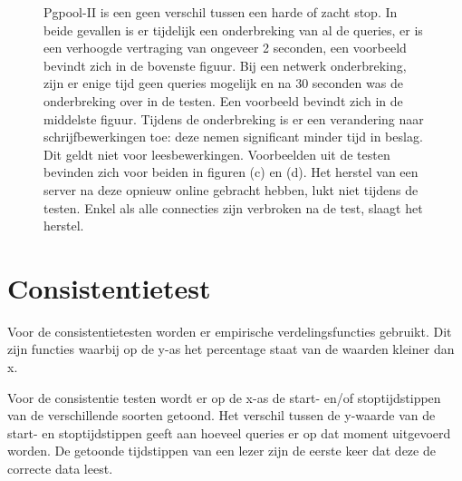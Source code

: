 \begin{figure}[ht!]
{	Pgpool-II is een geen verschil tussen een harde of zacht stop. In beide gevallen is er tijdelijk een onderbreking van al de queries, er is een verhoogde vertraging van ongeveer 2 seconden, een voorbeeld bevindt zich in de bovenste figuur. \newline
	Bij een netwerk onderbreking, zijn er enige tijd geen queries mogelijk en na 30 seconden was de onderbreking over in de testen. Een voorbeeld bevindt zich in de middelste figuur.  \newline
	Tijdens de onderbreking is er een verandering naar schrijfbewerkingen toe: deze nemen significant minder tijd in beslag. Dit geldt niet voor leesbewerkingen. Voorbeelden uit de testen bevinden zich voor beiden in figuren (c) en (d). \newline
	Het herstel van een server na deze opnieuw online gebracht hebben, lukt niet tijdens de testen. Enkel als alle connecties zijn verbroken na de test, slaagt het herstel.  }
	\label{fig:beschikbaar-pgpool}
\end{figure}

\FloatBarrier
\section{Consistentietest}
Voor de consistentietesten worden er empirische verdelingsfuncties gebruikt. Dit zijn functies waarbij op de y-as het percentage staat van de waarden kleiner dan x.

Voor de consistentie testen wordt er op de x-as de start- en/of stoptijdstippen van de verschillende soorten getoond. Het verschil tussen de y-waarde van de start- en stoptijdstippen geeft aan hoeveel queries er op dat moment uitgevoerd worden. De getoonde tijdstippen van een lezer zijn de eerste keer dat deze de correcte data leest. 

